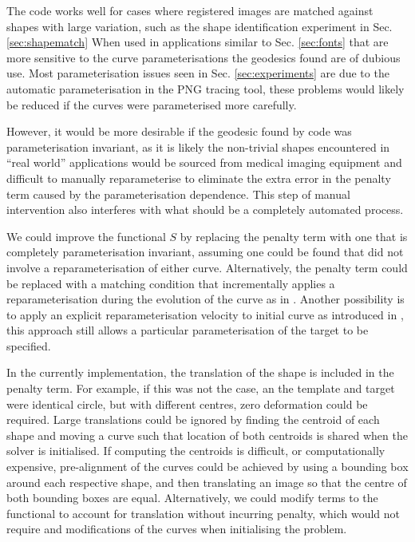 \documentclass[a4paper, 12pt]{article}
\begin{document}
The code works well for cases where registered images are matched against shapes
with large variation, such as the shape identification experiment in Sec.
\ref{sec:shapematch} When used in applications similar to Sec. \ref{sec:fonts}
that are more sensitive to the curve parameterisations the geodesics found are
of dubious use. Most parameterisation issues seen in Sec. \ref{sec:experiments} are due to the automatic
parameterisation in the PNG tracing tool, these problems would likely be reduced
if the curves  were  parameterised  more carefully. 

However, it would be more desirable if the geodesic found by code was
parameterisation invariant, as it is likely the non-trivial shapes encountered
in ``real world'' applications would be sourced from medical imaging equipment
and difficult to manually reparameterise to eliminate the extra error in the
penalty term caused by the parameterisation dependence. This step of manual
intervention also interferes with what should be a completely automated process.


We could improve the functional $S$ by replacing the penalty term with one that
is completely parameterisation invariant, assuming one could be found that did
not involve a reparameterisation of either curve. Alternatively, the penalty
term could be replaced with a matching condition that incrementally applies a
reparameterisation during the evolution of the curve as in
\cite{cotter2009geodesic}. Another possibility is to apply an explicit
reparameterisation velocity to initial curve as introduced in
\cite{clark2011reparam}, this approach still allows a particular
parameterisation of the target to be specified.


In the currently implementation, the translation of the shape is included in the
penalty term. For example, if this was not the case, an the template and target
were identical circle, but with different centres, zero deformation could be
required. Large translations could be ignored by finding the centroid of each
shape and moving a curve such that location of both centroids is shared when the
solver is initialised. If computing the centroids is difficult, or
computationally expensive, pre-alignment of the curves could be achieved by
using a bounding box around each respective shape, and then translating an image
so that the centre of both bounding boxes are equal. Alternatively, we could
modify terms to the functional  to account for translation without
incurring penalty, which would not require and modifications of the curves when
initialising the problem.
\end{document}
